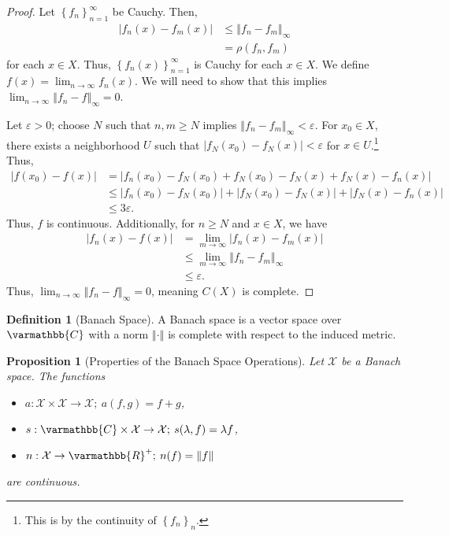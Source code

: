 \documentclass[12pt]{extarticle}
\newcommand{\R}{\mathbb{R}}
\newcommand{\C}{\mathbb{C}}
\newcommand{\norm}[1]{\left\Vert #1\right\Vert}
\newcommand{\set}[1]{\left\{#1\right\}}
\theoremstyle{plain}
\newtheorem*{proposition}{Proposition}
\theoremstyle{definition}
\newtheorem*{definition}{Definition}
\theoremstyle{note}
\renewcommand*{\mathbb}[1]{\varmathbb{#1}}
\renewcommand{\newline}{\hfill\break}
\begin{document}
\begin{proof}
  Let $\set{f_n}_{n=1}^{\infty}$ be Cauchy. Then,
  \begin{align*}
    \left\vert f_n(x) - f_m(x) \right\vert &\leq \norm{f_n - f_m}_{\infty}\\
    &= \rho(f_n,f_m)
  \end{align*}
  for each $x\in X$. Thus, $\set{f_n(x)}_{n=1}^{\infty}$ is Cauchy for each $x\in X$. We define $f(x) = \lim_{n\rightarrow \infty}f_n(x)$. We will need to show that this implies $\lim_{n\rightarrow\infty}\norm{f_n-f}_{\infty} = 0$.\newline

  Let $\varepsilon > 0$; choose $N$ such that $n,m \geq N$ implies $\norm{f_n - f_m}_{\infty} < \varepsilon$. For $x_0\in X$, there exists a neighborhood $U$ such that $\left\vert f_N(x_0) - f_N(x) \right\vert < \varepsilon$ for $x\in U$.\footnote{This is by the continuity of $\set{f_n}_n$.} Thus,
  \begin{align*}
    \left\vert f(x_0) - f(x) \right\vert &= \left\vert f_n(x_0) - f_N(x_0) + f_N(x_0) - f_N(x) + f_N(x) - f_n(x) \right\vert\\
                                         &\leq \left\vert f_n(x_0) - f_N(x_0) \right\vert + \left\vert f_N(x_0) - f_N(x) \right\vert + \left\vert f_N(x) - f_n(x) \right\vert\\
                                         &\leq 3\varepsilon.
  \end{align*}
  Thus, $f$ is continuous. Additionally, for $n\geq N$ and $x\in X$, we have
  \begin{align*}
    \left\vert f_n(x) - f(x) \right\vert &= \lim_{m\rightarrow\infty}\left\vert f_n(x) - f_m(x) \right\vert\\
                                         &\leq \lim_{m\rightarrow\infty}\norm{f_n-f_m}_{\infty}\\
                                         &\leq \varepsilon.
  \end{align*}
  Thus, $\lim_{n\rightarrow\infty}\norm{f_n - f}_{\infty} = 0$, meaning $C(X)$ is complete.
\end{proof}
\begin{definition}[Banach Space]
  A Banach space is a vector space over $\C$ with a norm $\norm{\cdot}$ is complete with respect to the induced metric.
\end{definition}
\begin{proposition}[Properties of the Banach Space Operations]
  Let $\mathcal{X}$ be a Banach space. The functions
  \begin{itemize}
    \item $a: \mathcal{X}\times \mathcal{X} \rightarrow \mathcal{X};\:a(f,g) = f+g$,
    \item $s: \C\times \mathcal{X}\rightarrow \mathcal{X};\:s(\lambda,f) = \lambda f$,
    \item $n: \mathcal{X}\rightarrow \R^{+};\:n(f) = \norm{f}$
  \end{itemize}
  are continuous.
\end{proposition}
\end{document}
